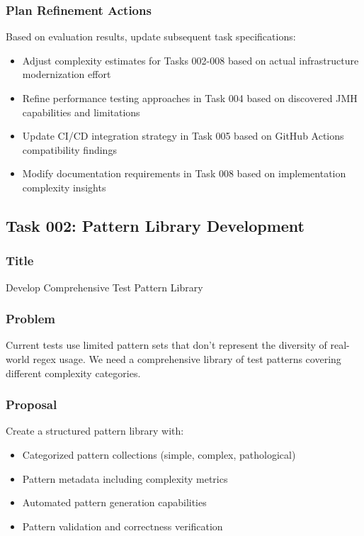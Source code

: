 \documentclass[11pt,a4paper]{article}
\begin{document}
\subsubsection{Plan Refinement Actions}
Based on evaluation results, update subsequent task specifications:
\begin{itemize}
    \item Adjust complexity estimates for Tasks 002-008 based on actual infrastructure modernization effort
    \item Refine performance testing approaches in Task 004 based on discovered JMH capabilities and limitations
    \item Update CI/CD integration strategy in Task 005 based on GitHub Actions compatibility findings
    \item Modify documentation requirements in Task 008 based on implementation complexity insights
\end{itemize}


\subsection{Task 002: Pattern Library Development}

\subsubsection{Title}
Develop Comprehensive Test Pattern Library

\subsubsection{Problem}
Current tests use limited pattern sets that don't represent the diversity of real-world regex usage. We need a comprehensive library of test patterns covering different complexity categories.

\subsubsection{Proposal}
Create a structured pattern library with:
\begin{itemize}
    \item Categorized pattern collections (simple, complex, pathological)
    \item Pattern metadata including complexity metrics
    \item Automated pattern generation capabilities
    \item Pattern validation and correctness verification
\end{itemize}
\end{document}
